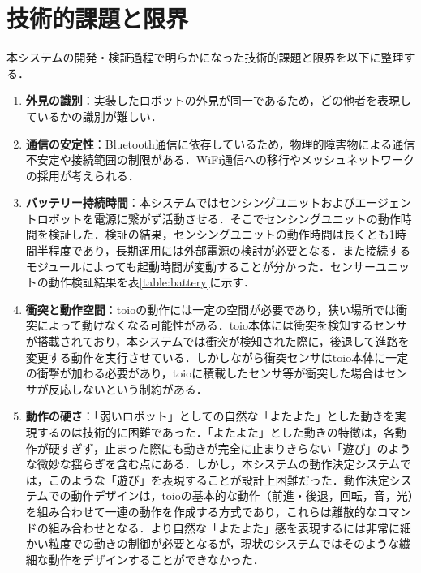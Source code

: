 \documentclass{cuxarticle}
\begin{document}
\section{技術的課題と限界}
本システムの開発・検証過程で明らかになった技術的課題と限界を以下に整理する．

\begin{enumerate}
  \item \textbf{外見の識別}：実装したロボットの外見が同一であるため，どの他者を表現しているかの識別が難しい．

  \item \textbf{通信の安定性}：Bluetooth通信に依存しているため，物理的障害物による通信不安定や接続範囲の制限がある．WiFi通信への移行やメッシュネットワークの採用が考えられる．

  \item \textbf{バッテリー持続時間}：本システムではセンシングユニットおよびエージェントロボットを電源に繋がず活動させる．そこでセンシングユニットの動作時間を検証した．検証の結果，センシングユニットの動作時間は長くとも1時間半程度であり，長期運用には外部電源の検討が必要となる．また接続するモジュールによっても起動時間が変動することが分かった．センサーユニットの動作検証結果を表\ref{table:battery}に示す．

  \item \textbf{衝突と動作空間}：toioの動作には一定の空間が必要であり，狭い場所では衝突によって動けなくなる可能性がある．toio本体には衝突を検知するセンサが搭載されており，本システムでは衝突が検知された際に，後退して進路を変更する動作を実行させている．しかしながら衝突センサはtoio本体に一定の衝撃が加わる必要があり，toioに積載したセンサ等が衝突した場合はセンサが反応しないという制約がある．

  \item \textbf{動作の硬さ}：「弱いロボット」としての自然な「よたよた」とした動きを実現するのは技術的に困難であった．「よたよた」とした動きの特徴は，各動作が硬すぎず，止まった際にも動きが完全に止まりきらない「遊び」のような微妙な揺らぎを含む点にある．しかし，本システムの動作決定システムでは，このような「遊び」を表現することが設計上困難だった．動作決定システムでの動作デザインは，toioの基本的な動作（前進・後退，回転，音，光）を組み合わせて一連の動作を作成する方式であり，これらは離散的なコマンドの組み合わせとなる．より自然な「よたよた」感を表現するには非常に細かい粒度での動きの制御が必要となるが，現状のシステムではそのような繊細な動作をデザインすることができなかった．
\end{enumerate}
\end{document}
